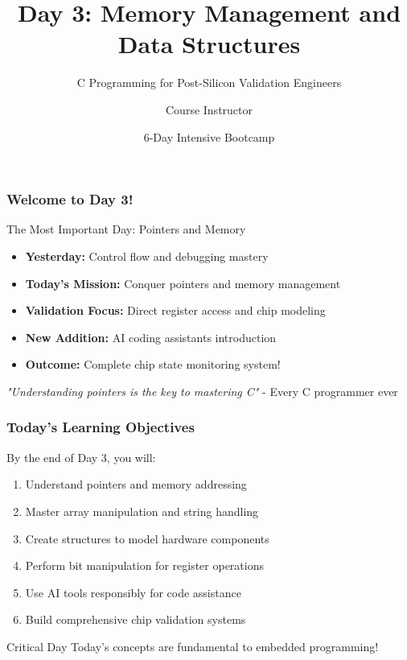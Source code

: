 \documentclass{beamer}
\title{Day 3: Memory Management and Data Structures}
\subtitle{C Programming for Post-Silicon Validation Engineers}
\author{Course Instructor}
\date{6-Day Intensive Bootcamp}
\institute{Post-Silicon Validation Training Program}
\begin{document}
\frame{\titlepage}

\begin{frame}
\frametitle{Welcome to Day 3!}
\begin{center}
\Large The Most Important Day: Pointers and Memory
\end{center}

\begin{itemize}
    \item \textbf{Yesterday:} Control flow and debugging mastery
    \item \textbf{Today's Mission:} Conquer pointers and memory management
    \item \textbf{Validation Focus:} Direct register access and chip modeling
    \item \textbf{New Addition:} AI coding assistants introduction
    \item \textbf{Outcome:} Complete chip state monitoring system!
\end{itemize}

\vspace{0.5cm}
\begin{center}
\textit{"Understanding pointers is the key to mastering C"} - Every C programmer ever
\end{center}
\end{frame}

\begin{frame}
\frametitle{Today's Learning Objectives}
By the end of Day 3, you will:

\begin{enumerate}
    \item Understand pointers and memory addressing
    \item Master array manipulation and string handling
    \item Create structures to model hardware components
    \item Perform bit manipulation for register operations
    \item Use AI tools responsibly for code assistance
    \item Build comprehensive chip validation systems
\end{enumerate}

\vspace{0.5cm}
\begin{alertblock}{Critical Day}
Today's concepts are fundamental to embedded programming!
\end{alertblock}
\end{frame}
\end{document}
